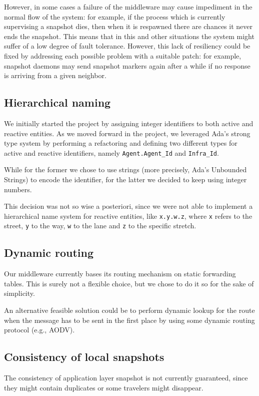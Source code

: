 However, in some cases a failure of the middleware may cause impediment in the
normal flow of the system: for example, if the process which is currently
supervising a snapshot dies, then when it is respawned there are chances it
never ends the snapshot.
This means that in this and other situations the system might suffer of a low
degree of fault tolerance. However, this lack of resiliency could be fixed by
addressing each possible problem with a suitable patch: for example, snapshot
daemons may send snapshot markers again after a while if no response is
arriving from a given neighbor.

\subsection{Hierarchical naming}
We initially started the project by assigning integer identifiers to both
active and reactive entities. As we moved forward in the project, we leveraged
Ada's strong type system by performing a refactoring and defining two different
types for active and reactive identifiers, namely \texttt{Agent.Agent\_Id} and
\texttt{Infra\_Id}.

While for the former we chose to use strings (more precisely, Ada's Unbounded
Strings) to encode the identifier, for the latter we decided to keep using
integer numbers.

This decision was not so wise a posteriori, since we were not able to implement
a hierarchical name system for reactive entities, like \texttt{x.y.w.z}, where
\texttt{x} refers to the street, \texttt{y} to the way, \texttt{w} to the lane
and \texttt{z} to the specific stretch.

\subsection{Dynamic routing}
Our middleware currently bases its routing mechanism on static forwarding
tables. This is surely not a flexible choice, but we chose to do it so for the
sake of simplicity.

An alternative feasible solution could be to perform dynamic lookup for the
route when the message has to be sent in the first place by using some dynamic
routing protocol (e.g., AODV).

\subsection{Consistency of local snapshots}
The consistency of application layer snapshot is not currently guaranteed,
since they might contain duplicates or some travelers might disappear.

